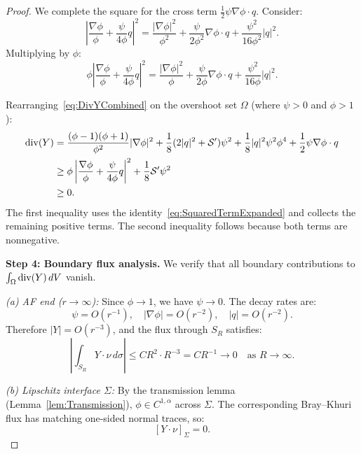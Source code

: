 \begin{proof}
We complete the square for the cross term $\frac{1}{2} \psi \nabla \phi \cdot q$. Consider:
\begin{equation}\label{eq:CompletingSquare}
    \left| \frac{\nabla \phi}{\phi} + \frac{\psi}{4\phi} q \right|^2 = \frac{|\nabla \phi|^2}{\phi^2} + \frac{\psi}{2\phi^2} \nabla \phi \cdot q + \frac{\psi^2}{16\phi^2} |q|^2.
\end{equation}
Multiplying by $\phi$:
\begin{equation}\label{eq:SquaredTermExpanded}
    \phi \left| \frac{\nabla \phi}{\phi} + \frac{\psi}{4\phi} q \right|^2 = \frac{|\nabla \phi|^2}{\phi} + \frac{\psi}{2\phi} \nabla \phi \cdot q + \frac{\psi^2}{16\phi} |q|^2.
\end{equation}

Rearranging~\eqref{eq:DivYCombined} on the overshoot set $\Omega$ (where $\psi > 0$ and $\phi > 1$):
\begin{align}
    \mathrm{div}(Y) &= \frac{(\phi - 1)(\phi + 1)}{\phi^2} |\nabla \phi|^2 + \frac{1}{8}(2|q|^2 + \mathcal{S}') \psi^2 + \frac{1}{8} |q|^2 \psi^2 \phi^4 + \frac{1}{2} \psi \nabla \phi \cdot q \nonumber\\
    &\ge \phi \left| \frac{\nabla \phi}{\phi} + \frac{\psi}{4\phi} q \right|^2 + \frac{1}{8} \mathcal{S}' \psi^2 \nonumber\\
    &\ge 0. \label{eq:DivYPositivity-deriv}
\end{align}
The first inequality uses the identity~\eqref{eq:SquaredTermExpanded} and collects the remaining positive terms. The second inequality follows because both terms are nonnegative.

\textbf{Step 4: Boundary flux analysis.}
We verify that all boundary contributions to $\int_\Omega \mathrm{div}(Y) \, dV$ vanish.

\textit{(a) AF end ($r \to \infty$):} Since $\phi \to 1$, we have $\psi \to 0$. The decay rates are:
\begin{equation}\label{eq:AFDecay}
    \psi = O(r^{-1}), \quad |\nabla \phi| = O(r^{-2}), \quad |q| = O(r^{-2}).
\end{equation}
Therefore $|Y| = O(r^{-3})$, and the flux through $S_R$ satisfies:
\begin{equation}\label{eq:AFFlux}
    \left| \int_{S_R} Y \cdot \nu \, d\sigma \right| \le C R^2 \cdot R^{-3} = C R^{-1} \to 0 \quad \text{as } R \to \infty.
\end{equation}

\textit{(b) Lipschitz interface $\Sigma$:} By the transmission lemma (Lemma~\ref{lem:Transmission}), $\phi \in C^{1,\alpha}$ across $\Sigma$. The corresponding Bray--Khuri flux has matching one-sided normal traces, so:
\begin{equation}\label{eq:InterfaceFlux}
    [Y \cdot \nu]_\Sigma = 0.
\end{equation}


\end{proof}
